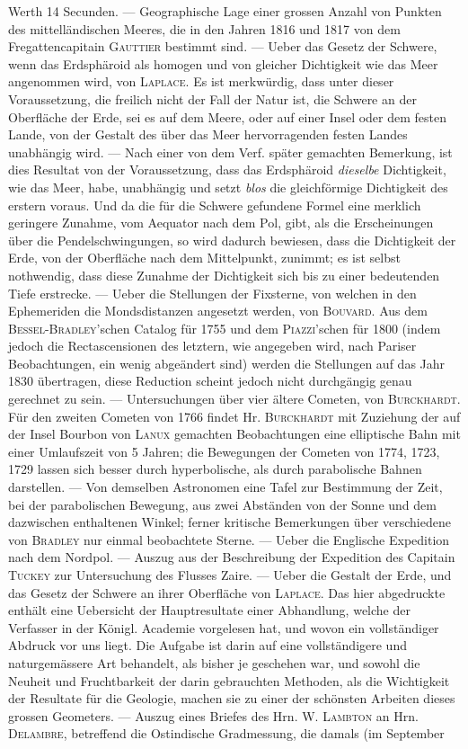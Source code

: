 Werth 14 Secunden. --- Geographische Lage einer grossen Anzahl von Punkten des mittelländischen Meeres, die in den Jahren 1816 und 1817 von dem Fregattencapitain \textsc{Gauttier} bestimmt sind. --- Ueber das Gesetz der Schwere, wenn das Erdsphäroid als homogen und von gleicher Dichtigkeit wie das Meer angenommen wird, von \textsc{Laplace}. Es ist merkwürdig, dass unter dieser Voraussetzung, die freilich nicht der Fall der Natur ist, die Schwere an der Oberfläche der Erde, sei es auf dem Meere, oder auf einer Insel oder dem festen Lande, von der Gestalt des über das Meer hervorragenden festen Landes unabhängig wird. --- Nach einer von dem Verf. später gemachten Bemerkung, ist dies Resultat von der Voraussetzung, dass das Erdsphäroid \emph{dieselbe} Dichtigkeit, wie das Meer, habe, unabhängig und setzt \emph{blos} die gleichförmige Dichtigkeit des erstern voraus. Und da die für die Schwere gefundene Formel eine merklich geringere Zunahme, vom Aequator nach dem Pol, gibt, als die Erscheinungen über die Pendelschwingungen, so wird dadurch bewiesen, dass die Dichtigkeit der Erde, von der Oberfläche nach dem Mittelpunkt, zunimmt; es ist selbst nothwendig, dass diese Zunahme der Dichtigkeit sich bis zu einer bedeutenden Tiefe erstrecke. --- Ueber die Stellungen der Fixsterne, von welchen in den Ephemeriden die Mondsdistanzen angesetzt werden, von \textsc{Bouvard}. Aus dem \textsc{Bessel}-\textsc{Bradley}'schen Catalog für 1755 und dem \textsc{Piazzi}'schen für 1800 (indem jedoch die Rectascensionen des letztern, wie angegeben wird, nach Pariser Beobachtungen, ein wenig abgeändert sind) werden die Stellungen auf das Jahr 1830 übertragen, diese Reduction scheint jedoch nicht durchgängig genau gerechnet zu sein. --- Untersuchungen über vier ältere Cometen, von \textsc{Burckhardt}. Für den zweiten Cometen von 1766 findet Hr. \textsc{Burckhardt} mit Zuziehung der auf der Insel Bourbon von \textsc{Lanux} gemachten Beobachtungen eine elliptische Bahn mit einer Umlaufszeit von 5 Jahren; die Bewegungen der Cometen von 1774, 1723, 1729 lassen sich besser durch hyperbolische, als durch parabolische Bahnen darstellen. --- Von demselben Astronomen eine Tafel zur Bestimmung der Zeit, bei der parabolischen Bewegung, aus zwei Abständen von der Sonne und dem dazwischen enthaltenen Winkel; ferner kritische Bemerkungen über verschiedene von \textsc{Bradley} nur einmal beobachtete Sterne. --- Ueber die Englische Expedition nach dem Nordpol. --- Auszug aus der Beschreibung der Expedition des Capitain \textsc{Tuckey} zur Untersuchung des Flusses Zaire. --- Ueber die Gestalt der Erde, und das Gesetz der Schwere an ihrer Oberfläche von \textsc{Laplace}. Das hier abgedruckte enthält eine Uebersicht der Hauptresultate einer Abhandlung, welche der Verfasser in der Königl. Academie vorgelesen hat, und wovon ein vollständiger Abdruck vor uns liegt. Die Aufgabe ist darin auf eine vollständigere und naturgemässere Art behandelt, als bisher je geschehen war, und sowohl die Neuheit und Fruchtbarkeit der darin gebrauchten Methoden, als die Wichtigkeit der Resultate für die Geologie, machen sie zu einer der schönsten Arbeiten dieses grossen Geometers. --- Auszug eines Briefes des Hrn. W. \textsc{Lambton} an Hrn. \textsc{Delambre}, betreffend die Ostindische Gradmessung, die damals (im September 